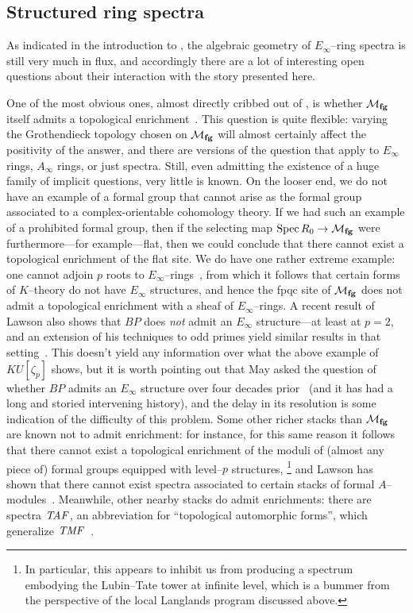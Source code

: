 \subsection*{Structured ring spectra}

As indicated in the introduction to , the algebraic geometry of \(E_\infty\)--ring spectra is still very much in flux, and accordingly there are a lot of interesting open questions about their interaction with the story presented here.

One of the most obvious ones, almost directly cribbed out of , is whether \(\mathcal{M}_{\mathbf{fg}}\) itself admits a topological enrichment~\cite{GoerssRealizingFamilies}.
This question is quite flexible: varying the Grothendieck topology chosen on \(\mathcal{M}_{\mathbf{fg}}\) will almost certainly affect the positivity of the answer, and there are versions of the question that apply to \(E_\infty\) rings, \(A_\infty\) rings, or just spectra.
Still, even admitting the existence of a huge family of implicit questions, very little is known.
On the looser end, we do not have an example of a formal group that cannot arise as the formal group associated to a complex-orientable cohomology theory.
If we had such an example of a prohibited formal group, then if the selecting map \(\operatorname{Spec} R_0 \to \mathcal{M}_{\mathbf{fg}}\) were furthermore---for example---flat, then we could conclude that there cannot exist a topological enrichment of the flat site.
We do have one rather extreme example: one cannot adjoin \(p\){\th} roots to \(E_\infty\)--rings~\cite{SchwaenzlRolandVogt,Devalapurkar}, from which it follows that certain forms of \(K\)--theory do not have \(E_\infty\) structures, and hence the fpqc site of \(\mathcal{M}_{\mathbf{fg}}\) does not admit a topological enrichment with a sheaf of \(E_\infty\)--rings.
A recent result of Lawson also shows that \(BP\) does \emph{not} admit an \(E_\infty\) structure---at least at \(p = 2\), and an extension of his techniques to odd primes yield similar results in that setting~\cite{LawsonSecondaryPowerOps,Senger}.
This doesn't yield any information over what the above example of \(KU[\zeta_p]\) shows, but it is worth pointing out that May asked the question of whether \(BP\) admits an \(E_\infty\) structure over four decades prior~\cite{MayProblemsInLoopspaceTheory} (and it has had a long and storied intervening history), and the delay in its resolution is some indication of the difficulty of this problem.
Some other richer stacks than \(\mathcal{M}_{\mathbf{fg}}\) are known not to admit enrichment: for instance, for this same reason it follows that there cannot exist a topological enrichment of the moduli of (almost any piece of) formal groups equipped with level--\(p\) structures,%
\footnote{%
In particular, this appears to inhibit us from producing a spectrum embodying the Lubin--Tate tower at infinite level, which is a bummer from the perspective of the local Langlands program discussed above.
}
and Lawson has shown that there cannot exist spectra associated to certain stacks of formal \(A\)--modules~\cite{LawsonRealizability}.
Meanwhile, other nearby stacks do admit enrichments: there are spectra \(\mathit{TAF}\), an abbreviation for ``topological automorphic forms'', which generalize \(\mathit{TMF}\)~\cite{BehrensLawson}.

